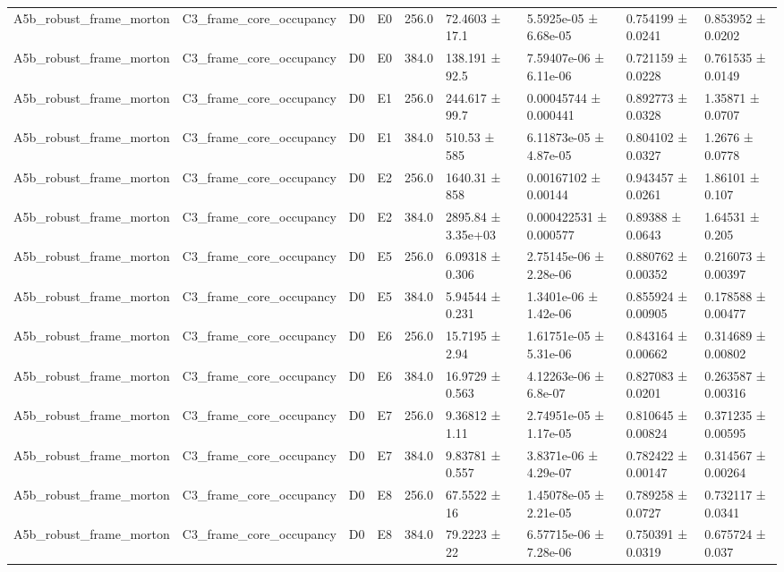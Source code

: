 \begin{table}
\begin{tabular}{lllllllll}
A5b\_robust\_frame\_morton & C3\_frame\_core\_occupancy & D0 & E0 & 256.0 & 72.4603 ± 17.1 & 5.5925e-05 ± 6.68e-05 & 0.754199 ± 0.0241 & 0.853952 ± 0.0202 \\
A5b\_robust\_frame\_morton & C3\_frame\_core\_occupancy & D0 & E0 & 384.0 & 138.191 ± 92.5 & 7.59407e-06 ± 6.11e-06 & 0.721159 ± 0.0228 & 0.761535 ± 0.0149 \\
A5b\_robust\_frame\_morton & C3\_frame\_core\_occupancy & D0 & E1 & 256.0 & 244.617 ± 99.7 & 0.00045744 ± 0.000441 & 0.892773 ± 0.0328 & 1.35871 ± 0.0707 \\
A5b\_robust\_frame\_morton & C3\_frame\_core\_occupancy & D0 & E1 & 384.0 & 510.53 ± 585 & 6.11873e-05 ± 4.87e-05 & 0.804102 ± 0.0327 & 1.2676 ± 0.0778 \\
A5b\_robust\_frame\_morton & C3\_frame\_core\_occupancy & D0 & E2 & 256.0 & 1640.31 ± 858 & 0.00167102 ± 0.00144 & 0.943457 ± 0.0261 & 1.86101 ± 0.107 \\
A5b\_robust\_frame\_morton & C3\_frame\_core\_occupancy & D0 & E2 & 384.0 & 2895.84 ± 3.35e+03 & 0.000422531 ± 0.000577 & 0.89388 ± 0.0643 & 1.64531 ± 0.205 \\
A5b\_robust\_frame\_morton & C3\_frame\_core\_occupancy & D0 & E5 & 256.0 & 6.09318 ± 0.306 & 2.75145e-06 ± 2.28e-06 & 0.880762 ± 0.00352 & 0.216073 ± 0.00397 \\
A5b\_robust\_frame\_morton & C3\_frame\_core\_occupancy & D0 & E5 & 384.0 & 5.94544 ± 0.231 & 1.3401e-06 ± 1.42e-06 & 0.855924 ± 0.00905 & 0.178588 ± 0.00477 \\
A5b\_robust\_frame\_morton & C3\_frame\_core\_occupancy & D0 & E6 & 256.0 & 15.7195 ± 2.94 & 1.61751e-05 ± 5.31e-06 & 0.843164 ± 0.00662 & 0.314689 ± 0.00802 \\
A5b\_robust\_frame\_morton & C3\_frame\_core\_occupancy & D0 & E6 & 384.0 & 16.9729 ± 0.563 & 4.12263e-06 ± 6.8e-07 & 0.827083 ± 0.0201 & 0.263587 ± 0.00316 \\
A5b\_robust\_frame\_morton & C3\_frame\_core\_occupancy & D0 & E7 & 256.0 & 9.36812 ± 1.11 & 2.74951e-05 ± 1.17e-05 & 0.810645 ± 0.00824 & 0.371235 ± 0.00595 \\
A5b\_robust\_frame\_morton & C3\_frame\_core\_occupancy & D0 & E7 & 384.0 & 9.83781 ± 0.557 & 3.8371e-06 ± 4.29e-07 & 0.782422 ± 0.00147 & 0.314567 ± 0.00264 \\
A5b\_robust\_frame\_morton & C3\_frame\_core\_occupancy & D0 & E8 & 256.0 & 67.5522 ± 16 & 1.45078e-05 ± 2.21e-05 & 0.789258 ± 0.0727 & 0.732117 ± 0.0341 \\
A5b\_robust\_frame\_morton & C3\_frame\_core\_occupancy & D0 & E8 & 384.0 & 79.2223 ± 22 & 6.57715e-06 ± 7.28e-06 & 0.750391 ± 0.0319 & 0.675724 ± 0.037 \\

\end{tabular}
\end{table}
